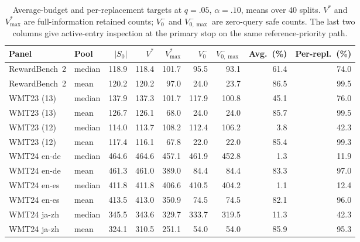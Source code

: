 \begin{table}[t]
\centering\small
\begin{tabular}{@{}llrrrrrrr@{}}
\toprule
Panel & Pool & $|S_0|$ & $V^*$ & $V^*_{\max}$ & $V^-_0$ & $V^-_{0,\max}$ & Avg.\ (\%) & Per-repl.\ (\%)\\
\midrule
RewardBench~2 & median & 118.9 & 118.4 & 101.7 & 95.5 & 93.1 & 61.4 & 74.0\\
RewardBench~2 & mean & 120.2 & 120.2 & 97.0 & 24.0 & 23.7 & 86.5 & 99.5\\
WMT23 (13) & median & 137.9 & 137.3 & 101.7 & 117.9 & 100.8 & 45.1 & 76.0\\
WMT23 (13) & mean & 126.7 & 126.1 & 68.0 & 24.0 & 24.0 & 85.7 & 99.5\\
WMT23 (12) & median & 114.0 & 113.7 & 108.2 & 112.4 & 106.2 & 3.8 & 42.3\\
WMT23 (12) & mean & 117.4 & 116.1 & 67.8 & 22.0 & 22.0 & 85.4 & 99.3\\
WMT24 en-de & median & 464.6 & 464.6 & 457.1 & 461.9 & 452.8 & 1.3 & 11.9\\
WMT24 en-de & mean & 461.3 & 461.0 & 389.0 & 84.4 & 84.4 & 83.3 & 97.0\\
WMT24 en-es & median & 411.8 & 411.8 & 406.6 & 410.5 & 404.2 & 1.1 & 12.4\\
WMT24 en-es & mean & 413.5 & 413.0 & 350.9 & 74.5 & 74.5 & 82.1 & 96.0\\
WMT24 ja-zh & median & 345.5 & 343.6 & 329.7 & 333.7 & 319.5 & 11.3 & 42.3\\
WMT24 ja-zh & mean & 324.1 & 310.5 & 251.1 & 54.0 & 54.0 & 85.9 & 95.3\\
\bottomrule
\end{tabular}
\caption{Average-budget and per-replacement targets at $q=.05$, $\alpha=.10$, means over 40 splits. $V^*$ and $V^*_{\max}$ are full-information retained counts; $V^-_0$ and $V^-_{0,\max}$ are zero-query safe counts. The last two columns give active-entry inspection at the primary stop on the same reference-priority path.}
\label{tab:per-replacement}
\end{table}
